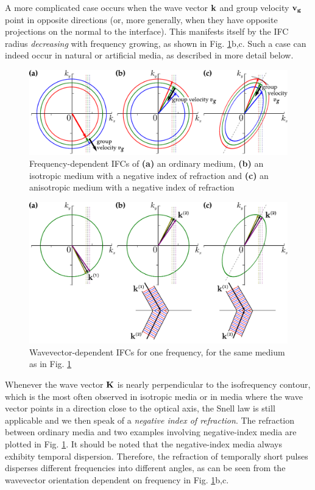A more complicated case occurs when the wave vector ${\mathbf{k}}$ and group velocity ${\mathbf{v_g}}$ point in opposite directions (or, more generally, when they have opposite projections on the normal to the interface).  This manifests itself by the IFC radius \textit{decreasing} with frequency growing, as shown in  Fig. \ref{fg_ifcnr}b,c.
Such a case can indeed occur in natural or artificial media, as described in more detail below. 
\begin{figure}[ht] \caption{Frequency-dependent IFCs of \textbf{(a)} an ordinary medium, \textbf{(b)} an isotropic medium with a negative index of refraction and \textbf{(c)} an anisotropic medium with a negative index of refraction } \label{fg_ifcnr} \centering  %
	\includegraphics[width=.8\textwidth]{img/ifc_negrefr.pdf} 
\end{figure}
\begin{figure}[ht] \caption{Wavevector-dependent IFCs for one frequency, for the same medium as in Fig. \ref{fg_ifcnr} } \label{fg_ifcnrk} \centering  %
	\includegraphics[width=.8\textwidth]{img/ifc_negrefrk.pdf} 
\end{figure}

Whenever the wave vector ${\mathbf{K}}$ is nearly perpendicular to the isofrequency contour, which is the most often observed in isotropic media or in media where the wave vector points in a direction close to the optical axis, the Snell law is still applicable and we then speak of a \textit{negative index of refraction}.  The refraction between ordinary media and two examples involving negative-index media are plotted in Fig. \ref{fg_ifcnr}. It should be noted that the negative-index media always exhibity temporal dispersion. Therefore, the refraction of temporally short pulses disperses different frequencies into different angles, as can be seen from the wavevector orientation dependent on frequency in Fig. \ref{fg_ifcnr}b,c.

